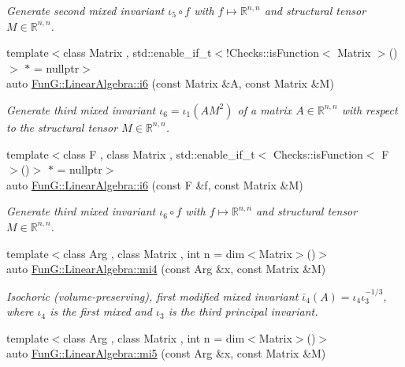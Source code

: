 \begin{DoxyCompactItemize}
\begin{DoxyCompactList}\small\item\em Generate second mixed invariant $ \iota_5\circ f $ with $f\mapsto\mathbb{R}^{n,n}$ and structural tensor $M\in\mathbb{R}^{n,n}$. \end{DoxyCompactList}\item 
{\footnotesize template$<$class Matrix , std\-::enable\-\_\-if\-\_\-t$<$!\-Checks\-::is\-Function$<$ Matrix $>$()$>$ $\ast$  = nullptr$>$ }\\auto \hyperlink{group__InvariantGroup_gad9f0627946667bb052212f65ecdd002b}{Fun\-G\-::\-Linear\-Algebra\-::i6} (const Matrix \&A, const Matrix \&M)
\begin{DoxyCompactList}\small\item\em Generate third mixed invariant $ \iota_6=\iota_1(AM^2) $ of a matrix $A\in\mathbb{R}^{n,n}$ with respect to the structural tensor $M\in\mathbb{R}^{n,n}$. \end{DoxyCompactList}\item 
{\footnotesize template$<$class F , class Matrix , std\-::enable\-\_\-if\-\_\-t$<$ Checks\-::is\-Function$<$ F $>$()$>$ $\ast$  = nullptr$>$ }\\auto \hyperlink{group__InvariantGroup_ga2536c80df733bb3e089487202c3688c1}{Fun\-G\-::\-Linear\-Algebra\-::i6} (const F \&f, const Matrix \&M)
\begin{DoxyCompactList}\small\item\em Generate third mixed invariant $ \iota_6\circ f $ with $f\mapsto\mathbb{R}^{n,n}$ and structural tensor $M\in\mathbb{R}^{n,n}$. \end{DoxyCompactList}\item 
{\footnotesize template$<$class Arg , class Matrix , int n = dim$<$\-Matrix$>$()$>$ }\\auto \hyperlink{group__InvariantGroup_ga7ee54c5d056877bdefefb8e54ad17791}{Fun\-G\-::\-Linear\-Algebra\-::mi4} (const Arg \&x, const Matrix \&M)
\begin{DoxyCompactList}\small\item\em Isochoric (volume-\/preserving), first modified mixed invariant $ \bar\iota_4(A)=\iota_4\iota_3^{-1/3} $, where $\iota_4$ is the first mixed and $\iota_3$ is the third principal invariant. \end{DoxyCompactList}\item 
{\footnotesize template$<$class Arg , class Matrix , int n = dim$<$\-Matrix$>$()$>$ }\\auto \hyperlink{group__InvariantGroup_ga189bc682b34d13902da335c5eb502faa}{Fun\-G\-::\-Linear\-Algebra\-::mi5} (const Arg \&x, const Matrix \&M)

\end{DoxyCompactItemize}
